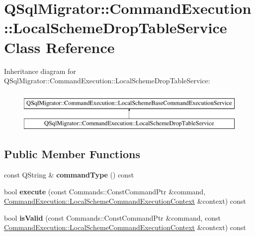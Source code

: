 \hypertarget{class_q_sql_migrator_1_1_command_execution_1_1_local_scheme_drop_table_service}{}\section{Q\+Sql\+Migrator\+:\+:Command\+Execution\+:\+:Local\+Scheme\+Drop\+Table\+Service Class Reference}
\label{class_q_sql_migrator_1_1_command_execution_1_1_local_scheme_drop_table_service}
Inheritance diagram for Q\+Sql\+Migrator\+:\+:Command\+Execution\+:\+:Local\+Scheme\+Drop\+Table\+Service\+:\begin{figure}[H]
\begin{center}
\leavevmode
\includegraphics[height=2.000000cm]{class_q_sql_migrator_1_1_command_execution_1_1_local_scheme_drop_table_service}
\end{center}
\end{figure}
\subsection*{Public Member Functions}
\begin{DoxyCompactItemize}
\item 
\mbox{\label{class_q_sql_migrator_1_1_command_execution_1_1_local_scheme_drop_table_service_a94b187417c9ac3ca6232da0a094f8a38}} 
const Q\+String \& {\bfseries command\+Type} () const
\item 
\mbox{\label{class_q_sql_migrator_1_1_command_execution_1_1_local_scheme_drop_table_service_a594d6abf4bba4fe5dcbcd0288004b0e3}} 
bool {\bfseries execute} (const Commands\+::\+Const\+Command\+Ptr \&command, \hyperlink{class_q_sql_migrator_1_1_command_execution_1_1_local_scheme_command_execution_context}{Command\+Execution\+::\+Local\+Scheme\+Command\+Execution\+Context} \&context) const
\item 
\mbox{\label{class_q_sql_migrator_1_1_command_execution_1_1_local_scheme_drop_table_service_a6e4317f5af8f777332ce460b25ca0958}} 
bool {\bfseries is\+Valid} (const Commands\+::\+Const\+Command\+Ptr \&command, const \hyperlink{class_q_sql_migrator_1_1_command_execution_1_1_local_scheme_command_execution_context}{Command\+Execution\+::\+Local\+Scheme\+Command\+Execution\+Context} \&context) const
\end{DoxyCompactItemize}


